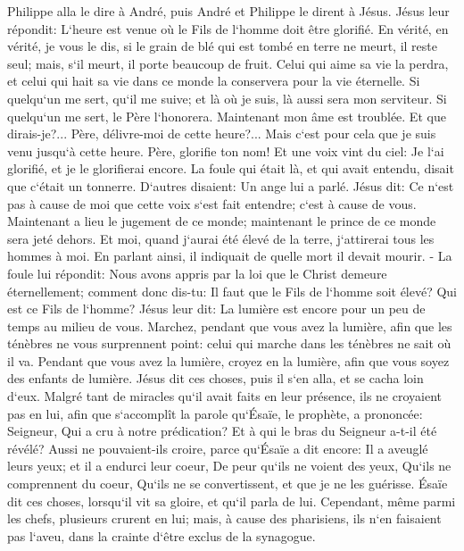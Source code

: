 \verse Philippe alla le dire à André, puis André et Philippe le dirent à Jésus. 
\verse Jésus leur répondit: L`heure est venue où le Fils de l`homme doit être glorifié. 
\verse En vérité, en vérité, je vous le dis, si le grain de blé qui est tombé en terre ne meurt, il reste seul; mais, s`il meurt, il porte beaucoup de fruit. 
\verse Celui qui aime sa vie la perdra, et celui qui hait sa vie dans ce monde la conservera pour la vie éternelle. 
\verse Si quelqu`un me sert, qu`il me suive; et là où je suis, là aussi sera mon serviteur. Si quelqu`un me sert, le Père l`honorera. 
\verse Maintenant mon âme est troublée. Et que dirais-je?... Père, délivre-moi de cette heure?... Mais c`est pour cela que je suis venu jusqu`à cette heure. 
\verse Père, glorifie ton nom! Et une voix vint du ciel: Je l`ai glorifié, et je le glorifierai encore. 
\verse La foule qui était là, et qui avait entendu, disait que c`était un tonnerre. D`autres disaient: Un ange lui a parlé. 
\verse Jésus dit: Ce n`est pas à cause de moi que cette voix s`est fait entendre; c`est à cause de vous. 
\verse Maintenant a lieu le jugement de ce monde; maintenant le prince de ce monde sera jeté dehors. 
\verse Et moi, quand j`aurai été élevé de la terre, j`attirerai tous les hommes à moi. 
\verse En parlant ainsi, il indiquait de quelle mort il devait mourir. - 
\verse La foule lui répondit: Nous avons appris par la loi que le Christ demeure éternellement; comment donc dis-tu: Il faut que le Fils de l`homme soit élevé? Qui est ce Fils de l`homme? 
\verse Jésus leur dit: La lumière est encore pour un peu de temps au milieu de vous. Marchez, pendant que vous avez la lumière, afin que les ténèbres ne vous surprennent point: celui qui marche dans les ténèbres ne sait où il va. 
\verse Pendant que vous avez la lumière, croyez en la lumière, afin que vous soyez des enfants de lumière. Jésus dit ces choses, puis il s`en alla, et se cacha loin d`eux. 
\verse Malgré tant de miracles qu`il avait faits en leur présence, ils ne croyaient pas en lui, 
\verse afin que s`accomplît la parole qu`Ésaïe, le prophète, a prononcée: Seigneur, Qui a cru à notre prédication? Et à qui le bras du Seigneur a-t-il été révélé? 
\verse Aussi ne pouvaient-ils croire, parce qu`Ésaïe a dit encore: 
\verse Il a aveuglé leurs yeux; et il a endurci leur coeur, De peur qu`ils ne voient des yeux, Qu`ils ne comprennent du coeur, Qu`ils ne se convertissent, et que je ne les guérisse. 
\verse Ésaïe dit ces choses, lorsqu`il vit sa gloire, et qu`il parla de lui. 
\verse Cependant, même parmi les chefs, plusieurs crurent en lui; mais, à cause des pharisiens, ils n`en faisaient pas l`aveu, dans la crainte d`être exclus de la synagogue. 

